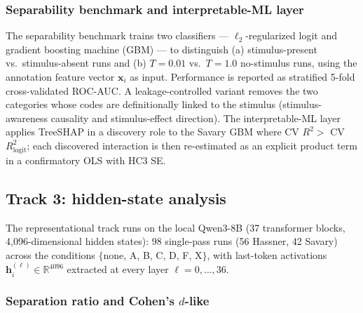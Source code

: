 \documentclass[14pt,a4paper]{extarticle}
\let\cite\squarecite
\begin{document}
\subsubsection*{Separability benchmark and interpretable-ML layer}

The separability benchmark trains two classifiers --- $\ell_2$-regularized logit and gradient boosting machine (GBM) --- to distinguish (a) stimulus-present vs.\ stimulus-absent runs and (b) $T=0.01$ vs.\ $T=1.0$ no-stimulus runs, using the annotation feature vector $\mathbf{x}_i$ as input. Performance is reported as stratified 5-fold cross-validated ROC-AUC. A leakage-controlled variant removes the two categories whose codes are definitionally linked to the stimulus (stimulus-awareness causality and stimulus-effect direction). The interpretable-ML layer applies TreeSHAP \cite{lundberg2017} in a discovery role to the Savary GBM where CV $R^2 > $ CV $R^2_{\mathrm{logit}}$; each discovered interaction is then re-estimated as an explicit product term in a confirmatory OLS with HC3 SE.

\subsection{Track 3: hidden-state analysis}

The representational track runs on the local Qwen3-8B (37 transformer blocks, 4{,}096-dimensional hidden states): 98 single-pass runs (56 Hassner, 42 Savary) across the conditions $\{$none, A, B, C, D, F, X$\}$, with last-token activations $\mathbf{h}^{(\ell)}_i \in \mathbb{R}^{4096}$ extracted at every layer $\ell = 0, \ldots, 36$.

\subsubsection*{Separation ratio and Cohen's $d$-like}
\end{document}
